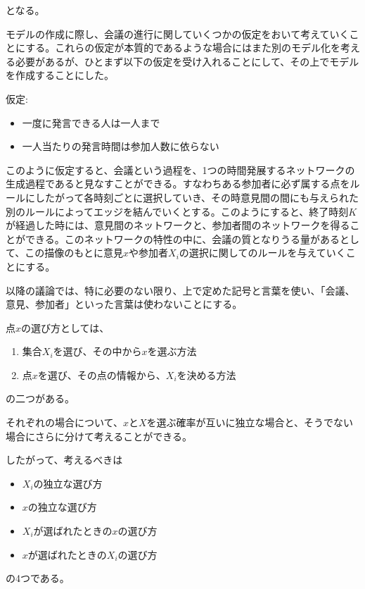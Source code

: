 となる。

モデルの作成に際し、会議の進行に関していくつかの仮定をおいて考えていくことにする。これらの仮定が本質的であるような場合にはまた別のモデル化を考える必要があるが、ひとまず以下の仮定を受け入れることにして、その上でモデルを作成することにした。

仮定:

\begin{itemize}
    \item 一度に発言できる人は一人まで
    \item 一人当たりの発言時間は参加人数に依らない
\end{itemize}


このように仮定すると、会議という過程を、1つの時間発展するネットワークの生成過程であると見なすことができる。すなわちある参加者に必ず属する点をルールにしたがって各時刻ごとに選択していき、その時意見間の間にも与えられた別のルールによってエッジを結んでいくとする。このようにすると、終了時刻$K$が経過した時には、意見間のネットワークと、参加者間のネットワークを得ることができる。このネットワークの特性の中に、会議の質となりうる量があるとして、この描像のもとに意見$x$や参加者$X_{i}$の選択に関してのルールを与えていくことにする。

以降の議論では、特に必要のない限り、上で定めた記号と言葉を使い、「会議、意見、参加者」といった言葉は使わないことにする。

点$x$の選び方としては、

\begin{enumerate}
    \item 集合$X_{i}$を選び、その中から$x$を選ぶ方法
    \item 点$x$を選び、その点の情報から、$X_{i}$を決める方法
\end{enumerate}


の二つがある。

それぞれの場合について、$x$と$X$を選ぶ確率が互いに独立な場合と、そうでない場合にさらに分けて考えることができる。

したがって、考えるべきは

\begin{itemize}
    \item $X_{i}$の独立な選び方
    \item $x$の独立な選び方
    \item $X_{i}$が選ばれたときの$x$の選び方
    \item $x$が選ばれたときの$X_{i}$の選び方
\end{itemize}

の4つである。




